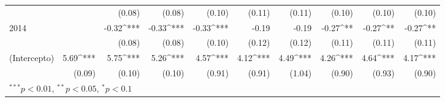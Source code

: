 \documentclass[12pt,letterpaper]{article}
\begin{document}
\begin{landscape}
\begin{table}
\begin{center}
\begin{tabular}{l D{.}{.}{5} D{.}{.}{5} D{.}{.}{5} D{.}{.}{5} D{.}{.}{5} D{.}{.}{5} D{.}{.}{5} D{.}{.}{5} D{.}{.}{5} }
				&                        & (0.08)                 & (0.08)                 & (0.10)                 & (0.11)                 & (0.11)                 & (0.10)                 & (0.10)                 & (0.10)                 \\
				2014                          &                        & -0.32^{***}            & -0.33^{***}            & -0.33^{***}            & -0.19                  & -0.19                  & -0.27^{**}             & -0.27^{**}             & -0.27^{**}             \\
				&                        & (0.08)                 & (0.08)                 & (0.10)                 & (0.12)                 & (0.12)                 & (0.11)                 & (0.11)                 & (0.11)                 \\
				(Intercepto)                  & 5.69^{***}             & 5.75^{***}             & 5.26^{***}             & 4.57^{***}             & 4.12^{***}             & 4.49^{***}             & 4.26^{***}             & 4.64^{***}             & 4.17^{***}             \\
				& (0.09)                 & (0.10)                 & (0.10)                 & (0.91)                 & (0.91)                 & (1.04)                 & (0.90)                 & (0.93)                 & (0.90)                 \\ \hline
			\end{tabular}
		\end{center}
	\end{table}
	
	\newpage
	

\end{landscape}
\end{document}
